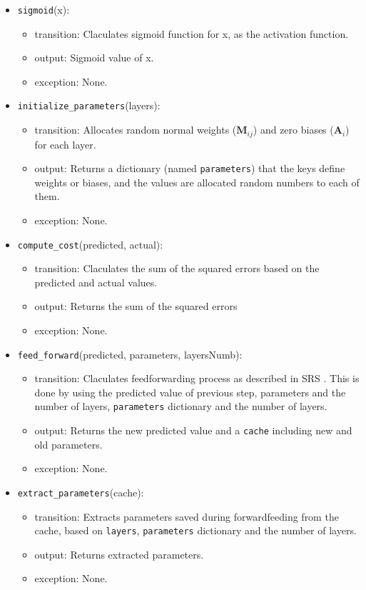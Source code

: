 \documentclass[12pt, titlepage]{article}
\def\code#1{\texttt{#1}}
\begin{document}
\begin{itemize}
  \item \code{sigmoid}(x):
  \begin{itemize}
    \item transition: Claculates sigmoid function for x, as the activation function.
    \item output: Sigmoid value of x. 
    \item exception: None.
  \end{itemize}

  \item \code{initialize\_parameters}(layers):
  \begin{itemize}
    \item transition: Allocates random normal weights ($\mathbf{M}_{ij}$) 
    and zero biases ($\mathbf{A}_{i}$) for each layer.
    \item output: Returns a dictionary (named \code{parameters}) 
    that the keys define weights or biases, and the values are allocated random numbers 
    to each of them.
    \item exception: None.
  \end{itemize}

  \item \code{compute\_cost}(predicted, actual):
  \begin{itemize}
    \item transition: Claculates the sum of the squared errors based on the 
    predicted and actual values.
    \item output: Returns the sum of the squared errors
    \item exception: None.
  \end{itemize}

  \item \code{feed\_forward}(predicted, parameters, layersNumb):
  \begin{itemize}
    \item transition: Claculates feedforwarding process as described in SRS \cite{SRS}. 
    This is done by using the predicted value of previous step, parameters and the number of layers, 
    \code{parameters} dictionary and the number of layers.
    \item output: Returns the new predicted value and a \code{cache} including new and old parameters.
    \item exception: None.
  \end{itemize}

  \item \code{extract\_parameters}(cache):
  \begin{itemize}
    \item transition: Extracts parameters saved during forwardfeeding from the cache, based on \code{layers},
    \code{parameters} dictionary and the number of layers.
    \item output: Returns extracted parameters.
    \item exception: None.
  \end{itemize}


\end{itemize}
\end{document}
